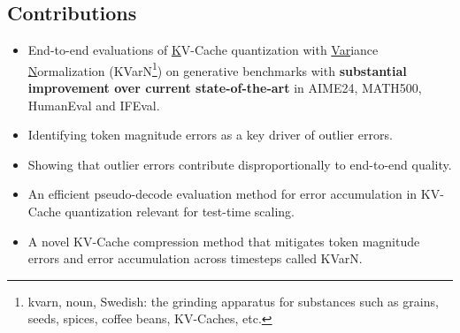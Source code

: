 \documentclass{article}
\newcommand{\methodname}{KVarN\xspace}
\begin{document}
\subsection{Contributions}

\begin{itemize}
    \item End-to-end evaluations of \underline{K}V-Cache quantization with \underline{Var}iance \underline{N}ormalization (\methodname \footnote{kvarn, noun, Swedish: the grinding apparatus for substances such as grains, seeds, spices, coffee beans, KV-Caches, etc.}) on generative benchmarks with \textbf{substantial improvement over current state-of-the-art} in AIME24, MATH500, HumanEval and IFEval.
    \item Identifying token magnitude errors as a key driver of outlier errors.
    \item Showing that outlier errors contribute disproportionally to end-to-end quality.
    \item An efficient pseudo-decode evaluation method for error accumulation in KV-Cache quantization relevant for test-time scaling.
    \item A novel KV-Cache compression method that mitigates token magnitude errors and error accumulation across timesteps called \methodname.%
    
\end{itemize}
\end{document}

